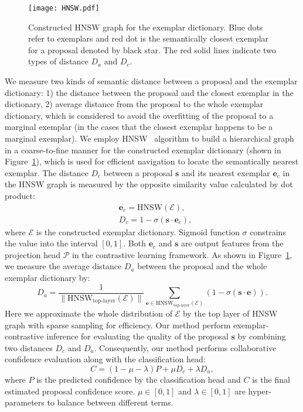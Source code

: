 \documentclass[journal]{IEEEtran}
\begin{document}
\begin{figure}[t]
\centering
    \texttt{[image: HNSW.pdf]}
\caption{Constructed HNSW graph for the exemplar dictionary. Blue dots refer to exemplars and red dot is the semantically closest exemplar for a proposal denoted by black star. The red solid lines indicate two types of distance $D_a$ and $D_c$.
    }
\label{Fig:hnsw}
\end{figure}

We measure two kinds of semantic distance between a proposal and the exemplar dictionary: 1) the distance between the proposal and the closest exemplar in the dictionary, 2) average distance from the proposal to the whole exemplar dictionary, which is considered to avoid the overfitting of the proposal to a marginal exemplar (in the cases that the closest exemplar happens to be a marginal exemplar). We employ HNSW~\cite{malkov2018efficient} algorithm to build a hierarchical graph in a coarse-to-fine manner for the constructed exemplar dictionary (shown in Figure~\ref{Fig:hnsw}), which is used for efficient navigation to locate the semantically nearest exemplar. The distance $D_c$ between a proposal $\mathbf{s}$ and its nearest exemplar $\mathbf{e}_c$ in the HNSW graph is measured by the opposite similarity value calculated by dot product:
\begin{equation}
    \begin{split}
        & \mathbf{e}_c = \text{HNSW}(\mathcal{E}), \\
        & D_c =  1-\sigma (\mathbf{s} \cdot \mathbf{e}_c),
    \end{split}
\end{equation}
where $\mathcal{E}$ is the constructed exemplar dictionary. Sigmoid function $\sigma$ constrains the value into the interval $[0,1]$. Both $\mathbf{e}_c$ and $\mathbf{s}$ are output features from the projection head $\mathcal{P}$ in the contrastive learning framework. As shown in Figure~\ref{Fig:hnsw}, we measure the average distance $D_a$ between the proposal and the whole exemplar dictionary by:
\begin{equation}
    D_a = \frac{1}{\parallel \text{HNSW}_{\text{top-layer}}(\mathcal{E}) \parallel} \sum_{\mathbf{e} \in \text{HNSW}_{\text{top-layer}}(\mathcal{E})} (1-\sigma (\mathbf{s} \cdot \mathbf{e})).
\end{equation}
Here we approximate the whole distribution of $\mathcal{E}$ by the top layer of HNSW graph with sparse sampling for efficiency. Our method perform exemplar-contrastive inference for evaluating the quality of the proposal  $\mathbf{s}$ by combining two distances $D_c$ and $D_a$. Consequently, our method performs collaborative confidence evaluation along with the classification head:
\begin{equation}
    C = (1-\mu -\lambda) P + \mu D_c + \lambda D_a,
    \label{eqn:differ_mu_lamda}
\end{equation}
where $P$ is the predicted confidence by the classification head and $C$ is the final estimated proposal confidence score. $\mu\in [0,1]$ and $\lambda \in [0,1]$ are hyper-parameters to balance between different terms. 
\end{document}
